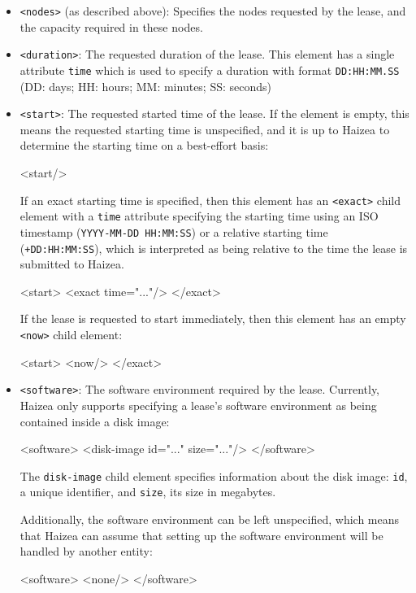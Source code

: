 \begin{itemize}
 \item \texttt{<nodes>} (as described above): Specifies the nodes requested by the lease, and the capacity required in these nodes.
 \item \texttt{<duration>}: The requested duration of the lease. This element has a single attribute \texttt{time} which is used to specify a duration with format \texttt{DD:HH:MM.SS} (DD: days; HH: hours; MM: minutes; SS: seconds)
 \item \texttt{<start>}: The requested started time of the lease. If the element is empty, this means the requested starting time is unspecified, and it is up to Haizea to determine the starting time on a best-effort basis:
\begin{wideshellverbatim} 
<start/>
\end{wideshellverbatim}

If an exact starting time is specified, then this element has an \texttt{<exact>} child element with a \texttt{time} attribute specifying the starting time using an ISO timestamp (\texttt{YYYY-MM-DD HH:MM:SS}) or a relative starting time (\texttt{+DD:HH:MM:SS}), which is interpreted as being relative to the time the lease is submitted to Haizea.

\begin{wideshellverbatim} 
<start>
  <exact time="..."/>
</exact>
\end{wideshellverbatim}

If the lease is requested to start immediately, then this element has an empty \texttt{<now>} child element:

\begin{wideshellverbatim} 
<start>
  <now/>
</exact>
\end{wideshellverbatim}

 \item \texttt{<software>}: The software environment required by the lease. Currently, Haizea only supports specifying a lease's software environment as being contained inside a disk image:

\begin{wideshellverbatim} 
<software>
  <disk-image id="..." size="..."/>
</software>
\end{wideshellverbatim}

The \texttt{disk-image} child element specifies information about the disk image: \texttt{id}, a unique identifier, and \texttt{size}, its size in megabytes.

Additionally, the software environment can be left unspecified, which means that Haizea can assume that setting up the software environment will be handled by another entity:

\begin{wideshellverbatim} 
<software>
  <none/>
</software>
\end{wideshellverbatim}

\end{itemize}


